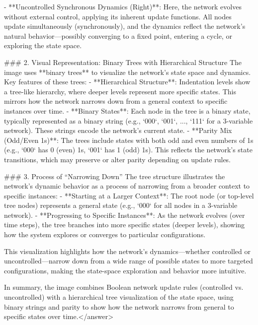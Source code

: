 - **Uncontrolled Synchronous Dynamics (Right)**:  
  Here, the network evolves without external control, applying its inherent update functions. All nodes update simultaneously (synchronously), and the dynamics reflect the network’s natural behavior—possibly converging to a fixed point, entering a cycle, or exploring the state space.    


### 2. Visual Representation: Binary Trees with Hierarchical Structure  
The image uses **binary trees** to visualize the network’s state space and dynamics. Key features of these trees:  
- **Hierarchical Structure**: Indentation levels show a tree-like hierarchy, where deeper levels represent more specific states. This mirrors how the network narrows down from a general context to specific instances over time.  
- **Binary States**: Each node in the tree is a binary state, typically represented as a binary string (e.g., `000`, `001`, ..., `111` for a 3-variable network). These strings encode the network’s current state.  
- **Parity Mix (Odd/Even 1s)**: The trees include states with both odd and even numbers of 1s (e.g., `000` has 0 (even) 1s, `001` has 1 (odd) 1s). This reflects the network’s state transitions, which may preserve or alter parity depending on update rules.    


### 3. Process of “Narrowing Down”  
The tree structure illustrates the network’s dynamic behavior as a process of narrowing from a broader context to specific instances:  
- **Starting at a Larger Context**: The root node (or top-level tree nodes) represents a general state (e.g., `000` for all nodes in a 3-variable network).  
- **Progressing to Specific Instances**: As the network evolves (over time steps), the tree branches into more specific states (deeper levels), showing how the system explores or converges to particular configurations.  

This visualization highlights how the network’s dynamics—whether controlled or uncontrolled—narrow down from a wide range of possible states to more targeted configurations, making the state-space exploration and behavior more intuitive.    


In summary, the image combines Boolean network update rules (controlled vs. uncontrolled) with a hierarchical tree visualization of the state space, using binary strings and parity to show how the network narrows from general to specific states over time.</answer>